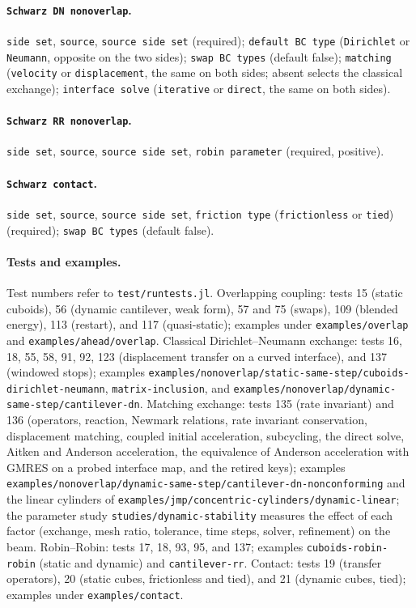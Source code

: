 \documentclass[11pt]{article}
\newcommand{\code}[1]{\texttt{#1}}
\begin{document}
\paragraph{\code{Schwarz DN nonoverlap}.} \code{side set}, \code{source},
\code{source side set} (required); \code{default BC type}
(\code{Dirichlet} or \code{Neumann}, opposite on the two sides);
\code{swap BC types} (default false); \code{matching} (\code{velocity} or
\code{displacement}, the same on both sides; absent selects the classical
exchange); \code{interface solve} (\code{iterative} or \code{direct}, the
same on both sides).

\paragraph{\code{Schwarz RR nonoverlap}.} \code{side set}, \code{source},
\code{source side set}, \code{robin parameter} (required, positive).

\paragraph{\code{Schwarz contact}.} \code{side set}, \code{source},
\code{source side set}, \code{friction type} (\code{frictionless} or
\code{tied}) (required); \code{swap BC types} (default false).

\paragraph{Tests and examples.} Test numbers refer to
\code{test/runtests.jl}. Overlapping coupling: tests 15 (static cuboids),
56 (dynamic cantilever, weak form), 57 and 75 (swaps), 109 (blended
energy), 113 (restart), and 117 (quasi-static); examples under \code{examples/overlap}
and \code{examples/ahead/overlap}. Classical Dirichlet--Neumann exchange:
tests 16, 18, 55, 58, 91, 92, 123 (displacement transfer on a curved
interface), and 137 (windowed stops); examples
\code{examples/nonoverlap/static-same-step/cuboids-dirichlet-neumann},
\code{matrix-inclusion}, and
\code{examples/nonoverlap/dynamic-same-step/cantilever-dn}. Matching
exchange: tests 135 (rate invariant) and 136 (operators, reaction, Newmark
relations, rate invariant conservation, displacement matching, coupled
initial acceleration, subcycling, the direct solve, Aitken and Anderson
acceleration, the equivalence of Anderson acceleration with GMRES on a
probed interface map, and the retired keys); examples
\code{examples/nonoverlap/dynamic-same-step/cantilever-dn-nonconforming}
and the linear cylinders of \code{examples/jmp/concentric-cylinders/dynamic-linear};
the
parameter study \code{studies/dynamic-stability} measures the effect of
each factor (exchange, mesh ratio, tolerance, time steps, solver,
refinement) on the beam. Robin--Robin: tests 17, 18, 93, 95, and 137;
examples \code{cuboids-robin-robin} (static and dynamic) and
\code{cantilever-rr}. Contact: tests 19 (transfer operators), 20 (static
cubes, frictionless and tied), and 21 (dynamic cubes, tied); examples
under \code{examples/contact}.
\end{document}
